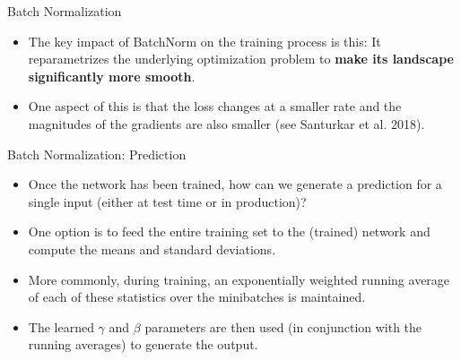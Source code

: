 \begin{frame} {Batch Normalization}
  \begin{itemize}
    \item The key impact of BatchNorm on the training process is this: It reparametrizes the underlying optimization problem to \textbf{make its landscape significantly more smooth}.
    \item One aspect of this is that the loss changes at a smaller rate and the magnitudes of the gradients are also smaller (see Santurkar et al. 2018).
  \end{itemize}
  \begin{figure}
    \centering
  \end{figure}
\end{frame}

\begin{frame} {Batch Normalization: Prediction}
  \begin{itemize}
    \item Once the network has been trained, how can we generate a prediction for a single input (either at test time or in production)?
    \item One option is to feed the entire training set to the (trained) network and compute the means and standard deviations.
    \item More commonly, during training, an exponentially weighted running average of each of these statistics over the minibatches is maintained.
    \item The learned $\gamma$ and $\beta$ parameters are then used (in conjunction with the running averages) to generate the output.
  \end{itemize}
\end{frame}

